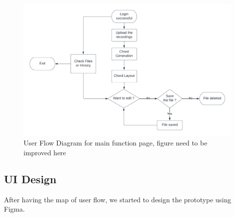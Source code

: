 \begin{figure}
\centering
\includegraphics[scale = 0.25]{Figures/MFpage.png}
\caption{User Flow Diagram for main function page, figure need to be improved here}
\end{figure}



\subsection{UI Design}
After having the map of user flow, we started to design the prototype using Figma.

